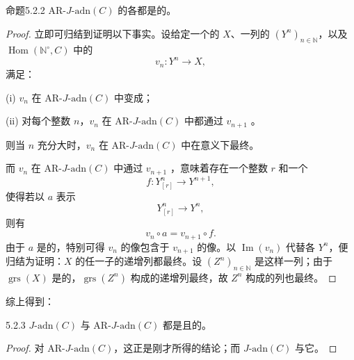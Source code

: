 \begin{SGAresult}{命题}{5.2.2}
 $\mathrm{AR}\text{-}J\text{-}\mathrm{adn}(C)$ 的各都是的。
\end{SGAresult}
\begin{proof}
立即可归结到证明以下事实。设给定一个的 $X$、一列的 $(Y^n)_{n\in\mathbb N}$，以及 $\operatorname{Hom}(\mathbb N^\circ,C)$ 中的
\[
v_n:Y^n\longrightarrow X,
\]
满足：

(i) $v_n$ 在 $\mathrm{AR}\text{-}J\text{-}\mathrm{adn}(C)$ 中变成；

(ii) 对每个整数 $n$，$v_n$ 在 $\mathrm{AR}\text{-}J\text{-}\mathrm{adn}(C)$ 中都通过 $v_{n+1}$ 。

则当 $n$ 充分大时，$v_n$ 在 $\mathrm{AR}\text{-}J\text{-}\mathrm{adn}(C)$ 中在意义下最终。

而 $v_n$ 在 $\mathrm{AR}\text{-}J\text{-}\mathrm{adn}(C)$ 中通过 $v_{n+1}$ ，意味着存在一个整数 $r$ 和一个
\[
f:Y^n_{[r]}\longrightarrow Y^{n+1},
\]
使得若以 $a$ 表示
\[
Y^n_{[r]}\longrightarrow Y^n,
\]
则有
\[
v_n\circ a=v_{n+1}\circ f.
\]
由于 $a$ 是的，特别可得 $v_n$ 的像包含于 $v_{n+1}$ 的像。以 $\operatorname{Im}(v_n)$ 代替各 $Y^n$，便归结为证明：$X$ 的任一子的递增列都最终。设 $(Z^n)_{n\in\mathbb N}$ 是这样一列；由于 $\operatorname{grs}(X)$ 是的，$\operatorname{grs}(Z^n)$ 构成的递增列最终，故 $Z^n$ 构成的列也最终。
\end{proof}
综上得到：

\begin{SGAresult}{}{5.2.3}
 $J\text{-}\mathrm{adn}(C)$ 与 $\mathrm{AR}\text{-}J\text{-}\mathrm{adn}(C)$ 都是且的。
\end{SGAresult}
\begin{proof}
对 $\mathrm{AR}\text{-}J\text{-}\mathrm{adn}(C)$，这正是刚才所得的结论；而 $J\text{-}\mathrm{adn}(C)$ 与它。
\end{proof}

